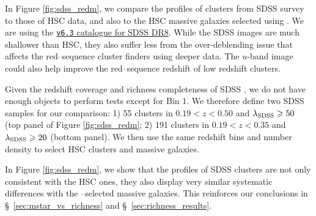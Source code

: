 \documentclass[fleqn,usenatbib,useAMS]{mnras}
\begin{document}
\begin{CJK*}{UTF8}{gbsn}
    In Figure \ref{fig:sdss_redm}, we compare the \dsigma{} profiles of \redm{} clusters from SDSS
    survey to those of HSC data, and also to the HSC massive galaxies selected using .
    We are using the \href{http://risa.stanford.edu/redmapper/}{\texttt{v6.3} catalogue for SDSS DR8}.
    While the SDSS images are much shallower than HSC, they also suffer less from the over-deblending
    issue that affects the red--sequence cluster finders using deeper data.
    The $u$-band image could also help improve the red--sequence redshift of low redshift clusters.
    
    Given the redshift coverage and richness completeness of SDSS \redm{}, we do not have enough 
    objects to perform \topn{} tests except for Bin 1. 
    We therefore define two SDSS \redm{} samples for our comparison: 
    1) 55 clusters in $0.19 < z < 0.50$ and $\lambda_{\rm SDSS} \geq 50$ (top panel of Figure 
    \ref{fig:sdss_redm}; 
    2) 191 clusters in $0.19 < z < 0.35$ and $\lambda_{\rm SDSS} \geq 20$ (bottom panel).
    We then use the same redshift bins and number density to select HSC \redm{} clusters and 
    massive galaxies.
    
    In Figure \ref{fig:sdss_redm}, we show that the \dsigma{} profiles of SDSS \redm{} clusters are
    not only consistent with the HSC \redm{} ones, they also display very similar systematic 
    differences with the --selected massive galaxies.
    This reinforces our conclusions in \S\ \ref{sec:mstar_vs_richness} and 
    \S\ \ref{sec:richness_results}.


\end{CJK*}
\end{document}
